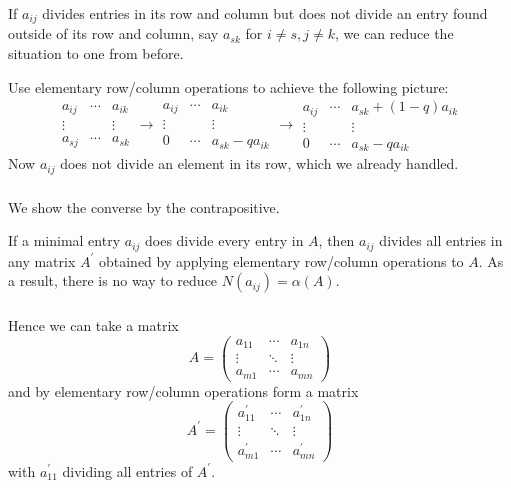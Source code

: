 \documentclass{beamer}
\begin{document}
\begin{frame}
  \frametitle{}

  If $a_{ij}$ divides entries in its row and column but does not divide an entry found outside of its row and column, say $a_{sk}$ for $i\neq s,j\neq k$, we can reduce the situation to one from before.

  Use elementary row/column operations to achieve the following picture:
  \[\begin{matrix}
    a_{ij} & \cdots & a_{ik}\\
    \vdots & & \vdots \\
    a_{sj} & \cdots & a_{sk}
  \end{matrix}\to \begin{matrix}
    a_{ij} & \cdots & a_{ik}\\
    \vdots & & \vdots \\
    0 & \cdots & a_{sk} -q a_{ik}
  \end{matrix}\to\begin{matrix}
    a_{ij} & \cdots & a_{sk} +(1-q) a_{ik}\\
    \vdots & & \vdots \\
    0 & \cdots & a_{sk} -q a_{ik}
  \end{matrix}\]
  Now $a_{ij}$ does not divide an element in its row, which we already handled.

\end{frame}

\begin{frame}
  \frametitle{}

  We show the converse by the contrapositive.
  
  If a minimal entry $a_{ij}$ does divide every entry in $A$, then $a_{ij}$ divides all entries in any matrix $A^{\prime}$ obtained by applying elementary row/column operations to $A$. As a result, there is no way to reduce $N(a_{ij}) = \alpha(A)$.

\end{frame}

\begin{frame}
  \frametitle{}

  Hence we can take a matrix \[A = \begin{pmatrix}
    a_{11} &\cdots &a_{1n}\\
    \vdots &\ddots &\vdots\\
    a_{m1} &\cdots & a_{mn}
  \end{pmatrix}\] and by elementary row/column operations form a matrix \[A^{\prime} = \begin{pmatrix}
    a_{11}^{\prime} &\cdots &a_{1n}^{\prime}\\
    \vdots &\ddots &\vdots\\
    a_{m1}^{\prime} &\cdots & a_{mn}^{\prime}
  \end{pmatrix}\] with $a_{11}^{\prime}$ dividing all entries of $A^{\prime}$.

\end{frame}
\end{document}
